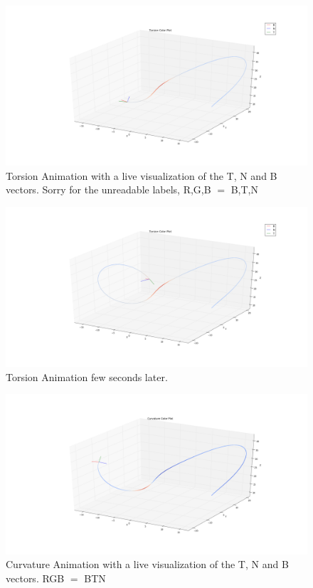 \documentclass[a4paper,10pt]{article}
\begin{document}
\begin{figure}
 \centering
 \includegraphics[width=\linewidth]{1}
 \caption{Torsion Animation with a live visualization of the T, N and B vectors. Sorry for the unreadable labels, R,G,B $=$ B,T,N}
  \label{mult1}  
\end{figure}

\begin{figure}
 \centering
 \includegraphics[width=\linewidth]{2}
 \caption{Torsion Animation few seconds later.}
  \label{mult2}
 \end{figure}
\begin{figure}
 \centering
 \includegraphics[width=\linewidth]{1c}
 \caption{Curvature Animation with a live visualization of the T, N and B vectors. RGB $=$ BTN }
  \label{mult3}  
\end{figure}
\end{document}
